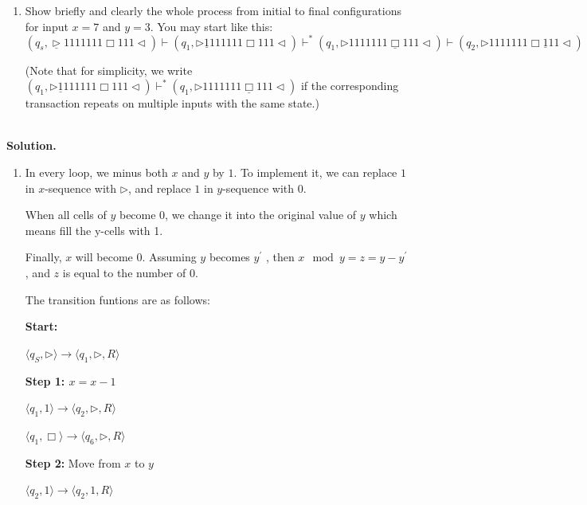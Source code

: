 \documentclass[12pt,a4paper]{article}
\theoremstyle{definition}
\begin{document}
\begin{enumerate}
\begin{enumerate}
			\item
			Show briefly and clearly the whole process from initial to final configurations for input $x = 7$ and $y = 3$. You may start like this:
			$$(q_s,\underline{\triangleright}  1  1  1  1  1  1  1  \Box 1  1  1   \triangleleft)
			\vdash (q_1,\triangleright  \underline{1}  1  1  1  1  1  1  \Box 1  1  1   \triangleleft)
			\vdash^* (q_1,\triangleright  1  1  1  1  1  1  1  \underline{\Box} 1  1  1   \triangleleft)
			\vdash (q_2,\triangleright  1  1  1  1  1  1  1  \Box \underline{1}  1  1   \triangleleft)$$
			
			\par{\color{blue}(Note that for simplicity, we write $(q_1,\triangleright  \underline{1}  1  1  1  1  1  1  \Box 1  1  1   \triangleleft)\vdash^* (q_1,\triangleright  1  1  1  1  1  1  1  \underline{\Box} 1  1  1   \triangleleft)$ if the corresponding transaction repeats on multiple inputs with the same state.)}
			
		\end{enumerate}
		
		~\\
		\textbf{Solution.}
		\begin{enumerate}
			\item In every loop, we minus both $x$ and $y$ by $1$. To implement it, we can replace $1$ in $x$-sequence with $\triangleright$, and replace $1$ in $y$-sequence with $0$. 
			
			When all cells of $y$ become $0$, we change it into the original value of $y$ which means fill the y-cells with 1. 
			
			Finally, $x$ will become $0$. Assuming $y$ becomes $y^\prime$ , then $x\mod y= z =y-y^\prime$, and $z$ is equal to the number of $0$.
			
			The transition funtions are as follows:
			
			\textbf{Start:}
			
			$\langle q_S,\triangleright\rangle\rightarrow\langle q_1,\triangleright,R\rangle$
			
			\textbf{Step 1: $x=x-1$}
			
			$\langle q_1,1\rangle\rightarrow\langle q_2,\triangleright,R\rangle$
			
			$\langle q_1,\Box\rangle\rightarrow\langle q_6,\triangleright,R\rangle$
			
			\textbf{Step 2:} Move from $x$  to $y$
			
			$\langle q_2,1\rangle\rightarrow\langle q_2,1,R\rangle$
			

\end{enumerate}
\end{enumerate}
\end{document}

